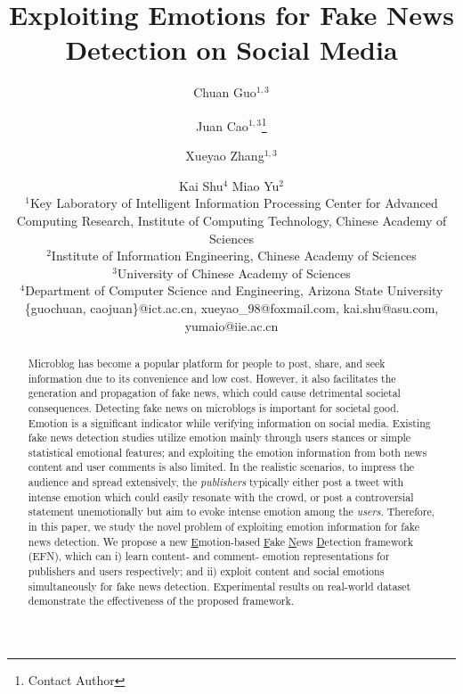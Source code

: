 \documentclass{article}
\title{Exploiting Emotions for Fake News Detection on Social Media}
\author{
	Chuan Guo$^{1,3}$\and
	Juan Cao$^{1,3}$\footnote{Contact Author}\and
	Xueyao Zhang$^{1,3}$\and
	Kai Shu$^4$\And
	Miao Yu$^{2}$\\
	\affiliations
	$^1$Key Laboratory of Intelligent Information Processing Center for Advanced Computing Research, Institute of Computing Technology, Chinese Academy of Sciences\\
	$^2$Institute of Information Engineering, Chinese Academy of Sciences\\
	$^3$University of Chinese Academy of Sciences\\
	$^4$Department of Computer Science and Engineering, Arizona State University\\
	\emails
	\{guochuan, caojuan\}@ict.ac.cn,
	xueyao\_98@foxmail.com,
	kai.shu@asu.com,
	yumaio@iie.ac.cn
}
\newcommand{\m}{EFN}
\begin{document}
	
	\maketitle
	
	\begin{abstract}
		Microblog has become a popular platform for people to post, share, and seek information due to its convenience and low cost. However, it also facilitates the generation and propagation of fake news, which could cause detrimental societal consequences. Detecting fake news on microblogs is important for societal good. Emotion is a significant indicator while verifying information on social media. 
		Existing fake news detection studies utilize emotion mainly through users stances or simple statistical emotional features; and exploiting the emotion information from both news content and user comments is also limited. In the realistic scenarios, to impress the audience and spread extensively, the \textit{publishers} typically either post a tweet with intense emotion which could easily resonate with the crowd, or post a controversial statement unemotionally but aim to evoke intense emotion among the \textit{users}. 
		Therefore, in this paper, we study the novel problem of exploiting emotion information for fake news detection. We propose a new \underline{E}motion-based \underline{F}ake \underline{N}ews \underline{D}etection framework ({\m}), which can i) learn content- and comment- emotion representations for publishers and users respectively; and ii) exploit content and social emotions simultaneously for fake news detection. Experimental results on real-world dataset demonstrate the effectiveness of the proposed framework.
	\end{abstract}
	
\end{document}
